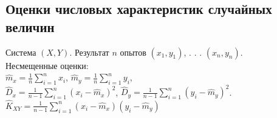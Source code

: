 \documentclass[russian, 12pt, fleqn,x11names]{article}
\begin{document}
\subsection{Оценки числовых характеристик случайных величин}
Система $(X, Y)$. Результат $n$ опытов $(x_1, y_1)$, . . . $(x_n, y_n)$.\\
Несмещенные оценки:\\
$\hat{m}_x= \frac{1}{n} \displaystyle{\sum\limits_{i = 1} ^{n}} x_i$,  $\hat{m}_y= \frac{1}{n} \displaystyle{\sum\limits_{i = 1} ^{n}} y_i$,\\
$\hat{D}_x = \frac{1}{n - 1} \displaystyle{\sum\limits_{i = 1} ^{n}} (x_i - \hat{m}_x)^2$, 
$\hat{D}_y  = \frac{1}{n - 1} \displaystyle{\sum\limits_{i = 1} ^{n}} (y_i - \hat{m}_y)^2$.\\
$\hat{K}_{XY} = \frac{1}{n - 1} \displaystyle{\sum\limits_{i = 1} ^{n}} (x_i - \hat{m}_x) (y_i - \hat{m}_y)$ 
\end{document}

